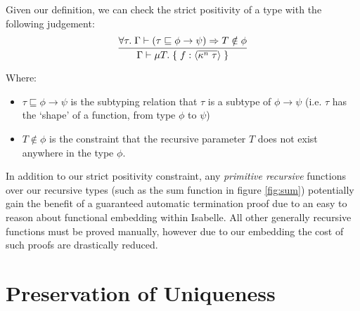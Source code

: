Given our definition, we can check the strict positivity of a type with the following judgement:
$$
\infer{
    \Gamma \vdash \mu T.\; \{\; f: \langle \overline{\kappa^n\; \tau} \rangle\; \}
}{
   \forall \tau.\; \Gamma \vdash (\tau \sqsubseteq \phi \rightarrow \psi) \implies T \notin \phi
}
$$

Where:
\begin{itemize}
    \item 
        $\tau \sqsubseteq \phi \rightarrow \psi$ is the subtyping relation that $\tau$ 
        is a subtype of $\phi \rightarrow \psi$ 
        (i.e. $\tau$ has the `shape' of a function, from type $\phi$ to $\psi$) 
    \item
        $T \notin \phi$ is the constraint that the recursive parameter $T$ 
        does not exist anywhere in the type $\phi$.
\end{itemize}

In addition to our strict positivity constraint, any \textit{primitive recursive} functions over
our recursive types (such as the sum function in figure \ref{fig:sum}) potentially gain the
benefit of a guaranteed automatic termination proof due to an easy to reason about functional
embedding within Isabelle. All other generally recursive functions must be proved manually,
however due to our embedding the cost of such proofs are drastically reduced.


\section{Preservation of Uniqueness}

